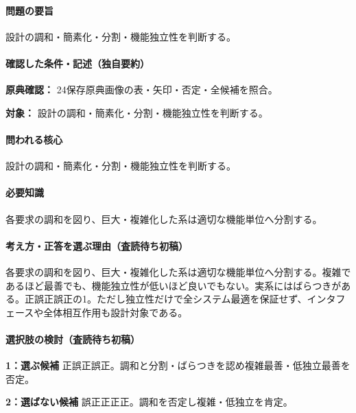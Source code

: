 \paragraph{問題の要旨} 設計の調和・簡素化・分割・機能独立性を判断する。

\paragraph{確認した条件・記述（独自要約）}\mbox{}\par

\noindent\textbf{原典確認：} 24保存原典画像の表・矢印・否定・全候補を照合。\par

\noindent\textbf{対象：} 設計の調和・簡素化・分割・機能独立性を判断する。\par

\paragraph{問われる核心} 設計の調和・簡素化・分割・機能独立性を判断する。

\paragraph{必要知識} 各要求の調和を図り、巨大・複雑化した系は適切な機能単位へ分割する。

\paragraph{考え方・正答を選ぶ理由（査読待ち初稿）} 各要求の調和を図り、巨大・複雑化した系は適切な機能単位へ分割する。複雑であるほど最善でも、機能独立性が低いほど良いでもない。実系にはばらつきがある。正誤正誤正の1。ただし独立性だけで全システム最適を保証せず、インタフェースや全体相互作用も設計対象である。

\paragraph{選択肢の検討（査読待ち初稿）}\mbox{}\par

\noindent\textbf{1：選ぶ候補} 正誤正誤正。調和と分割・ばらつきを認め複雑最善・低独立最善を否定。\par

\noindent\textbf{2：選ばない候補} 誤正正正正。調和を否定し複雑・低独立を肯定。\par

